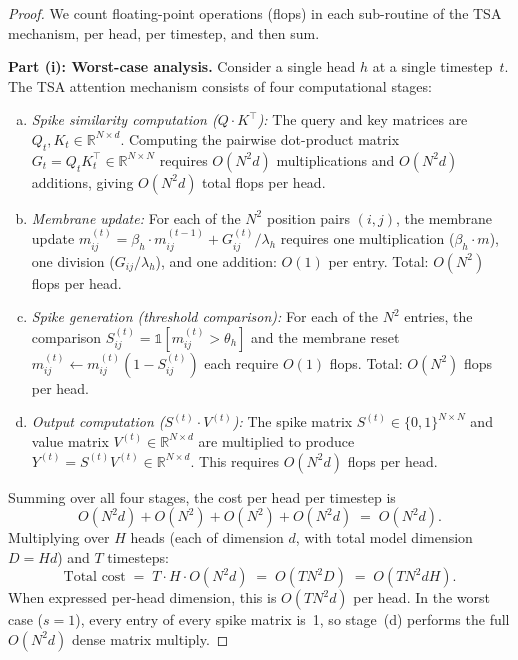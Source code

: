 \documentclass{article}
\begin{document}
\begin{proof}
We count floating-point operations (flops) in each sub-routine of the
TSA mechanism, per head, per timestep, and then sum.

\medskip
\noindent\textbf{Part (i): Worst-case analysis.}
Consider a single head $h$ at a single timestep~$t$.
The TSA attention mechanism consists of four computational stages:

\begin{enumerate}[(a)]
  \item \textit{Spike similarity computation ($Q \cdot K^\top$):}
    The query and key matrices are $Q_t, K_t \in \mathbb{R}^{N \times d}$.
    Computing the pairwise dot-product matrix $G_t = Q_t K_t^\top \in \mathbb{R}^{N \times N}$
    requires $O(N^2 d)$ multiplications and $O(N^2 d)$ additions,
    giving $O(N^2 d)$ total flops per head.

  \item \textit{Membrane update:}
    For each of the $N^2$ position pairs $(i,j)$, the membrane update
    $m_{ij}^{(t)} = \beta_h \cdot m_{ij}^{(t-1)} + G_{ij}^{(t)} / \lambda_h$
    requires one multiplication ($\beta_h \cdot m$), one division
    ($G_{ij}/\lambda_h$), and one addition: $O(1)$ per entry.
    Total: $O(N^2)$ flops per head.

  \item \textit{Spike generation (threshold comparison):}
    For each of the $N^2$ entries, the comparison
    $S_{ij}^{(t)} = \mathbb{1}[m_{ij}^{(t)} > \theta_h]$ and the
    membrane reset $m_{ij}^{(t)} \leftarrow m_{ij}^{(t)} (1 - S_{ij}^{(t)})$
    each require $O(1)$ flops.
    Total: $O(N^2)$ flops per head.

  \item \textit{Output computation ($S^{(t)} \cdot V^{(t)}$):}
    The spike matrix $S^{(t)} \in \{0,1\}^{N \times N}$ and value matrix
    $V^{(t)} \in \mathbb{R}^{N \times d}$ are multiplied to produce
    $Y^{(t)} = S^{(t)} V^{(t)} \in \mathbb{R}^{N \times d}$.
    This requires $O(N^2 d)$ flops per head.
\end{enumerate}

Summing over all four stages, the cost per head per timestep is
\[
  O(N^2 d) + O(N^2) + O(N^2) + O(N^2 d)
  \;=\; O(N^2 d).
\]
Multiplying over $H$ heads (each of dimension $d$, with total model
dimension $D = Hd$) and $T$ timesteps:
\[
  \text{Total cost} \;=\; T \cdot H \cdot O(N^2 d) \;=\; O(T N^2 D)
  \;=\; O(T N^2 d H).
\]
When expressed per-head dimension, this is $O(T N^2 d)$ per head.
In the worst case ($s = 1$), every entry of every spike matrix is~1,
so stage~(d) performs the full $O(N^2 d)$ dense matrix multiply.


\end{proof}
\end{document}
